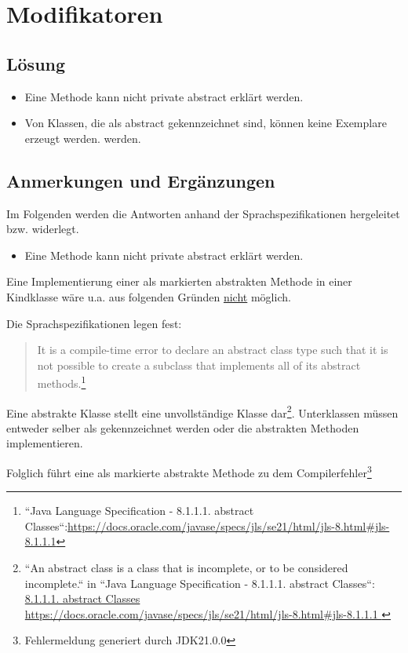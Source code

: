 \chapter{Modifikatoren}

\section*{Lösung}

\begin{itemize}
    \item Eine Methode kann nicht private abstract erklärt werden.
    \item Von Klassen, die als abstract gekennzeichnet sind, können keine Exemplare erzeugt werden.
    werden.
\end{itemize}


\section*{Anmerkungen und Ergänzungen}

Im Folgenden werden die Antworten anhand der Sprachspezifikationen hergeleitet bzw. widerlegt.

\begin{itemize}
    \item Eine Methode kann nicht private abstract erklärt werden.
\end{itemize}

Eine Implementierung einer als  markierten abstrakten Methode in einer Kindklasse wäre u.a. aus folgenden Gründen \underline{nicht} möglich.

Die Sprachspezifikationen legen fest:\blockquote{
It is a compile-time error to declare an abstract class type such that it is not possible to create a subclass that implements all of its abstract methods.\footnote{
    ``Java Language Specification - 8.1.1.1. abstract Classes``:\url{https://docs.oracle.com/javase/specs/jls/se21/html/jls-8.html#jls-8.1.1.1}
}
}


Eine abstrakte Klasse stellt  eine unvollständige Klasse dar\footnote{
``An abstract class is a class that is incomplete, or to be considered incomplete.`` in ``Java Language Specification - 8.1.1.1. abstract Classes``: \url{8.1.1.1. abstract Classes https://docs.oracle.com/javase/specs/jls/se21/html/jls-8.html#jls-8.1.1.1
}}.
Unterklassen müssen entweder selber als  gekennzeichnet werden oder die abstrakten Methoden implementieren.

Folglich führt eine als  markierte abstrakte Methode zu dem Compilerfehler\footnote{Fehlermeldung generiert durch JDK21.0.0}

